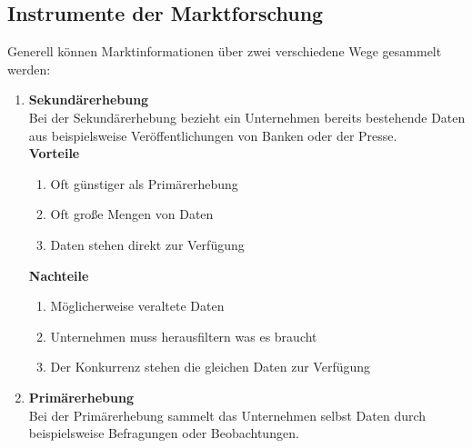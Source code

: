 \subsection{Instrumente der Marktforschung}
\begin{flushleft}
    Generell können Marktinformationen über zwei verschiedene Wege gesammelt werden:
    \begin{enumerate}
        \item {
            \textbf{Sekundärerhebung} \\
            Bei der Sekundärerhebung bezieht ein Unternehmen bereits bestehende Daten aus beispielsweise Veröffentlichungen von Banken oder der Presse. \\
            \textbf{Vorteile} \\
            \begin{enumerate}
                \item Oft günstiger als Primärerhebung
                \item Oft große Mengen von Daten
                \item Daten stehen direkt zur Verfügung
            \end{enumerate}
            \textbf{Nachteile} \\
            \begin{enumerate}
                \item Möglicherweise veraltete Daten
                \item Unternehmen muss herausfiltern was es braucht
                \item Der Konkurrenz stehen die gleichen Daten zur Verfügung
            \end{enumerate}
        }
        \item {
            \textbf{Primärerhebung} \\
            Bei der Primärerhebung sammelt das Unternehmen selbst Daten durch beispielsweise Befragungen oder Beobachtungen.
        }
    \end{enumerate}
\end{flushleft}

